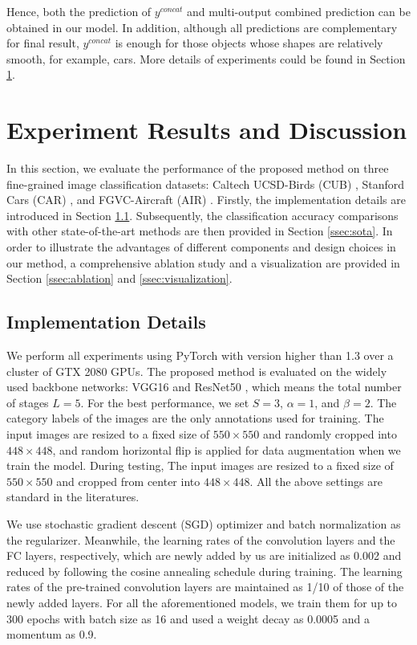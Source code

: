 \documentclass{llncs}
\begin{document}
Hence, both the prediction of ${y}^{concat}$ and multi-output combined prediction can be obtained in our model. In addition, although all predictions are complementary for final result, ${y}^{concat}$ is enough for those objects whose shapes are relatively smooth, for example, cars. More details of experiments could be found in Section \ref{sec:experiments}.


\section{Experiment Results and Discussion} \label{sec:experiments}

In this section, we evaluate the performance of the proposed method on three ﬁne-grained image classiﬁcation datasets: Caltech UCSD-Birds (CUB) \cite{wah2011caltech}, Stanford Cars (CAR) \cite{krause20133d}, and FGVC-Aircraft (AIR) \cite{maji2013fine}. Firstly, the implementation details are introduced in Section \ref{ssec:implementation}. Subsequently, the classiﬁcation accuracy comparisons with other state-of-the-art methods are then provided in Section \ref{ssec:sota}. In order to illustrate the advantages of different components and design choices in our method, a comprehensive ablation study and a visualization are provided in Section \ref{ssec:ablation} and \ref{ssec:visualization}.

\subsection{Implementation Details}\label{ssec:implementation}
 We perform all experiments using PyTorch \cite{paszke2017automatic} with version higher than 1.3 over a cluster of GTX 2080 GPUs. The proposed method is evaluated on the widely used backbone networks: VGG16 \cite{simonyan2014very} and ResNet50 \cite{he2016deep}, which means the total number of stages $L=5$. For the best performance, we set $S=3$, $\alpha=1$, and $\beta=2$. The category labels of the images are the only annotations used for training. The input images are resized to a ﬁxed size of $550 \times 550$ and randomly cropped into $448 \times 448$, and random horizontal ﬂip is applied for data augmentation when we train the model. During testing, The input images are resized to a ﬁxed size of $550 \times 550$ and cropped from center into $448 \times 448$. All the above settings are standard in the literatures. 
 
 We use stochastic gradient descent (SGD) optimizer and batch normalization as the regularizer. Meanwhile, the learning rates of the convolution layers and the FC layers, respectively, which are newly added by us are initialized as 0.002 and reduced by following the cosine annealing schedule \cite{loshchilov2016sgdr} during training. The learning rates of the pre-trained convolution layers are maintained as 1/10 of those of the newly added layers. For all the aforementioned models, we train them for up to 300 epochs with batch size as 16 and used a weight decay as 0.0005 and a momentum as 0.9.
\end{document}
